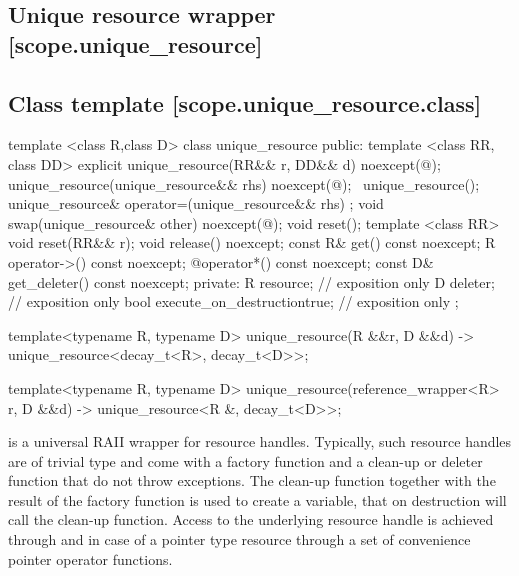 \documentclass[ebook,11pt,article]{memoir}
\begin{document}
\newpage

\subsection{Unique resource wrapper [scope.unique_resource]}

\subsection {Class template  [scope.unique_resource.class]}

\begin{codeblock}
template <class R,class D>
class unique_resource {
public:
  template <class RR, class DD>
    explicit 
    unique_resource(RR&& r, DD&& d) noexcept(@\seebelow@);
  unique_resource(unique_resource&& rhs) noexcept(@\seebelow@);
  ~unique_resource();
  unique_resource& operator=(unique_resource&& rhs) ;
  void swap(unique_resource& other) noexcept(@\seebelow@);
  void reset();
  template <class RR>
    void reset(RR&& r);
  void release() noexcept;
  const R& get() const noexcept;
  R operator->() const noexcept;  
  @\seebelow@ operator*() const noexcept;
  const D& get_deleter() const noexcept;
private:
  R resource; // exposition only
  D deleter; // exposition only
  bool execute_on_destruction{true}; // exposition only
};

template<typename R, typename D>
  unique_resource(R &&r, D &&d) 
    -> unique_resource<decay_t<R>, decay_t<D>>;

template<typename R, typename D>
  unique_resource(reference_wrapper<R> r, D &&d) 
    -> unique_resource<R &, decay_t<D>>;

\end{codeblock}

\pnum
\begin{note}
 is a universal RAII wrapper for resource handles.
Typically, such resource handles are of trivial type and come with a factory function and a clean-up or deleter function that do not throw exceptions.
The clean-up function together with the result of the factory function is used to create a  variable, that on destruction will call the clean-up function. Access to the underlying resource handle is achieved through  and in case of a pointer type resource through a set of convenience pointer operator functions.
\end{note}
\end{document}
